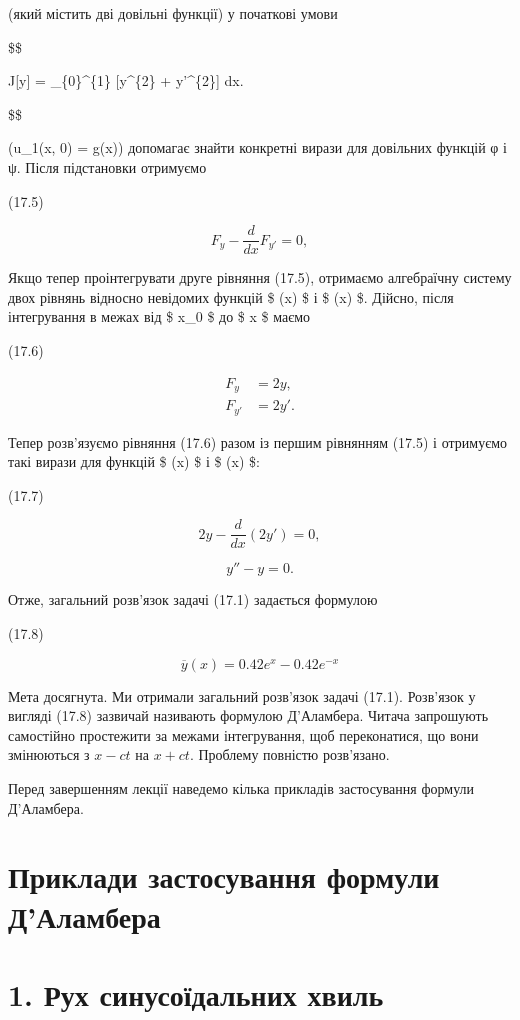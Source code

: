(який містить дві довільні функції) у початкові умови

\$\$

J{[}y{]} = \int\_\{0\}\^{}\{1\} {[}y\^{}\{2\} + y'\^{}\{2\}{]} dx.

\$\$

(u\_1(x, 0) = g(x)) допомагає знайти конкретні вирази для довільних функцій φ і ψ. Після підстановки отримуємо

(17.5)

\[
F_y - \frac{d}{dx} F_{y'} = 0,
\]

Якщо тепер проінтегрувати друге рівняння (17.5), отримаємо алгебраїчну систему двох рівнянь відносно невідомих функцій \$ \varphi(x) \$ і \$ \psi(x) \$. Дійсно, після інтегрування в межах від \$ x\_0 \$ до \$ x \$ маємо

(17.6)

\[
\begin{aligned}
F_y &= 2y, \\
F_{y'} &= 2y'.
\end{aligned}
\]

Тепер розв'язуємо рівняння (17.6) разом із першим рівнянням (17.5) і отримуємо такі вирази для функцій \$ \varphi(x) \$ і \$ \psi(x) \$:

(17.7)

\[
2y - \frac{d}{dx}(2y') = 0,
\]

\[
y'' - y = 0.
\]

Отже, загальний розв'язок задачі (17.1) задається формулою

(17.8)

\[
\overline{y}(x) = 0.42e^x - 0.42e^{-x}
\]

Мета досягнута. Ми отримали загальний розв'язок задачі (17.1). Розв'язок у вигляді (17.8) зазвичай називають формулою Д'Аламбера. Читача запрошують самостійно простежити за межами інтегрування, щоб переконатися, що вони змінюються з \(x-ct\) на \(x+ct\). Проблему повністю розв'язано.

Перед завершенням лекції наведемо кілька прикладів застосування формули Д'Аламбера.

\section{Приклади застосування формули Д'Аламбера}\label{ux43fux440ux438ux43aux43bux430ux434ux438-ux437ux430ux441ux442ux43eux441ux443ux432ux430ux43dux43dux44f-ux444ux43eux440ux43cux443ux43bux438-ux434ux430ux43bux430ux43cux431ux435ux440ux430}

\section{1. Рух синусоїдальних хвиль}\label{ux440ux443ux445-ux441ux438ux43dux443ux441ux43eux457ux434ux430ux43bux44cux43dux438ux445-ux445ux432ux438ux43bux44c}

